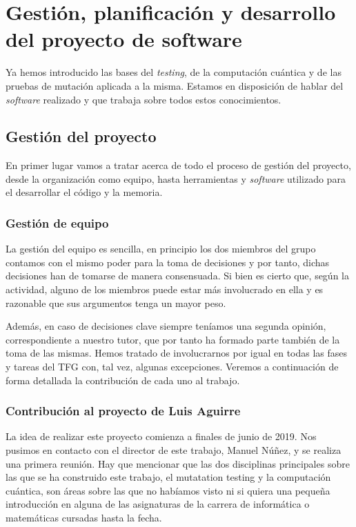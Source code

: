 \chapter[Gestión, planificación y desarrollo del software]{Gestión, planificación y desarrollo del proyecto de software}
Ya hemos introducido las bases del \textit{testing}, de la computación cuántica y de las pruebas de mutación aplicada a la misma. Estamos en disposición de hablar del \textit{software} realizado y que trabaja sobre todos estos conocimientos.

\section{Gestión del proyecto}

En primer lugar vamos a tratar acerca de todo el proceso de gestión del proyecto, desde la organización como equipo, hasta herramientas y \textit{software} utilizado para el desarrollar el código y la memoria.

\subsection{Gestión de equipo}

La gestión del equipo es sencilla, en principio los dos miembros del grupo contamos con el mismo poder para la toma de decisiones y por tanto, dichas decisiones han de tomarse de manera consensuada. Si bien es cierto que, según la actividad, alguno de los miembros puede estar más involucrado en ella y es razonable que sus argumentos tenga un mayor peso.

Además, en caso de decisiones clave siempre teníamos una segunda opinión, correspondiente a nuestro tutor, que por tanto ha formado parte también de la toma de las mismas. Hemos tratado de involucrarnos por igual en todas las fases y tareas del TFG con, tal vez, algunas excepciones. Veremos a continuación de forma detallada la contribución de cada uno al trabajo.

\subsection{Contribución al proyecto de Luis Aguirre}

La idea de realizar este proyecto comienza a finales de junio de 2019. Nos pusimos en contacto con el director de este trabajo, Manuel Núñez, y se realiza una primera reunión. Hay que mencionar que las dos disciplinas principales sobre las que se ha construido este trabajo, el mutatation testing y la computación cuántica, son áreas sobre las que no habíamos visto ni si quiera una pequeña introducción en alguna de las asignaturas de la carrera de informática o matemáticas cursadas hasta la fecha.

